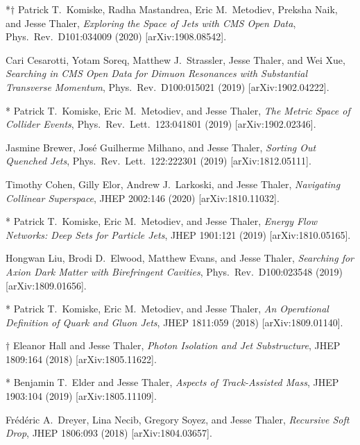 \begin{list}{[]\addtocounter{jessecount}{-1}}{\leftmargin=3em \itemsep=4pt}
\item
*$\dagger$ Patrick T.\ Komiske, Radha Mastandrea, Eric M.\ Metodiev, Preksha Naik, and Jesse Thaler,
\emph{Exploring the Space of Jets with CMS Open Data},
Phys.\ Rev.\ D101:034009 (2020)
[arXiv:1908.08542].

\item
 Cari Cesarotti, Yotam Soreq, Matthew J.\ Strassler, Jesse Thaler, and Wei Xue,
\emph{Searching in CMS Open Data for Dimuon Resonances with Substantial Transverse Momentum},
Phys.\ Rev.\ D100:015021 (2019)
[arXiv:1902.04222].

\item
* Patrick T.\ Komiske, Eric M.\ Metodiev, and Jesse Thaler,
\emph{The Metric Space of Collider Events},
Phys.\ Rev.\ Lett.\ 123:041801 (2019)
[arXiv:1902.02346].

\item
 Jasmine Brewer, José Guilherme Milhano, and Jesse Thaler,
\emph{Sorting Out Quenched Jets},
Phys.\ Rev.\ Lett.\ 122:222301 (2019)
[arXiv:1812.05111].

\item
 Timothy Cohen, Gilly Elor, Andrew J.\ Larkoski, and Jesse Thaler,
\emph{Navigating Collinear Superspace},
JHEP 2002:146 (2020)
[arXiv:1810.11032].

\item
* Patrick T.\ Komiske, Eric M.\ Metodiev, and Jesse Thaler,
\emph{Energy Flow Networks: Deep Sets for Particle Jets},
JHEP 1901:121 (2019)
[arXiv:1810.05165].

\item
 Hongwan Liu, Brodi D.\ Elwood, Matthew Evans, and Jesse Thaler,
\emph{Searching for Axion Dark Matter with Birefringent Cavities},
Phys.\ Rev.\ D100:023548 (2019)
[arXiv:1809.01656].

\item
* Patrick T.\ Komiske, Eric M.\ Metodiev, and Jesse Thaler,
\emph{An Operational Definition of Quark and Gluon Jets},
JHEP 1811:059 (2018)
[arXiv:1809.01140].

\item
$\dagger$ Eleanor Hall and Jesse Thaler,
\emph{Photon Isolation and Jet Substructure},
JHEP 1809:164 (2018)
[arXiv:1805.11622].

\item
* Benjamin T.\ Elder and Jesse Thaler,
\emph{Aspects of Track-Assisted Mass},
JHEP 1903:104 (2019)
[arXiv:1805.11109].

\item
 Frédéric A.\ Dreyer, Lina Necib, Gregory Soyez, and Jesse Thaler,
\emph{Recursive Soft Drop},
JHEP 1806:093 (2018)
[arXiv:1804.03657].


\end{list}
